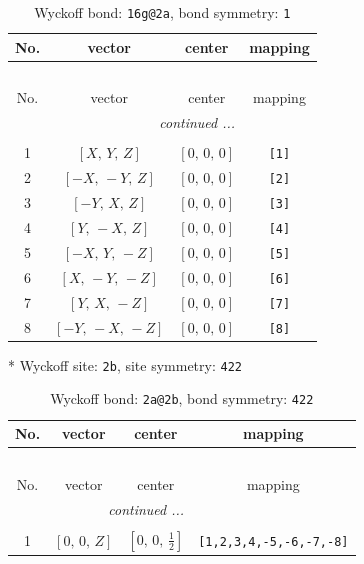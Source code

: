 \documentclass[fleqn,8pt]{jsarticle}
\begin{document}
\renewcommand{\arraystretch}{1.2}
\begin{longtable}{cccc}
\caption{Wyckoff bond: {\tt 16g@2a}, bond symmetry: {\tt 1}}
 \\
 \hline \hline
No. & vector & center & mapping \\ \hline \endfirsthead

\multicolumn{3}{l}{\tablename\ \thetable{}} \\
 \hline \hline
No. & vector & center & mapping \\ \hline \endhead

 \hline \hline
\multicolumn{3}{r}{\footnotesize\it continued ...} \\ \endfoot

 \hline \hline
\multicolumn{3}{r}{} \\ \endlastfoot

1 & $\left[ X,\, Y,\, Z \right]$ & $\left[ 0,\, 0,\, 0 \right]$ & {\tt [1]} \\ \hline
2 & $\left[ - X,\, - Y,\, Z \right]$ & $\left[ 0,\, 0,\, 0 \right]$ & {\tt [2]} \\ \hline
3 & $\left[ - Y,\, X,\, Z \right]$ & $\left[ 0,\, 0,\, 0 \right]$ & {\tt [3]} \\ \hline
4 & $\left[ Y,\, - X,\, Z \right]$ & $\left[ 0,\, 0,\, 0 \right]$ & {\tt [4]} \\ \hline
5 & $\left[ - X,\, Y,\, - Z \right]$ & $\left[ 0,\, 0,\, 0 \right]$ & {\tt [5]} \\ \hline
6 & $\left[ X,\, - Y,\, - Z \right]$ & $\left[ 0,\, 0,\, 0 \right]$ & {\tt [6]} \\ \hline
7 & $\left[ Y,\, X,\, - Z \right]$ & $\left[ 0,\, 0,\, 0 \right]$ & {\tt [7]} \\ \hline
8 & $\left[ - Y,\, - X,\, - Z \right]$ & $\left[ 0,\, 0,\, 0 \right]$ & {\tt [8]} \\
\end{longtable}
* Wyckoff site: {\tt 2b}, site symmetry: {\tt 422}
\renewcommand{\arraystretch}{1.2}
\begin{longtable}{cccc}
\caption{Wyckoff bond: {\tt 2a@2b}, bond symmetry: {\tt 422}}
 \\
 \hline \hline
No. & vector & center & mapping \\ \hline \endfirsthead

\multicolumn{3}{l}{\tablename\ \thetable{}} \\
 \hline \hline
No. & vector & center & mapping \\ \hline \endhead

 \hline \hline
\multicolumn{3}{r}{\footnotesize\it continued ...} \\ \endfoot

 \hline \hline
\multicolumn{3}{r}{} \\ \endlastfoot

1 & $\left[ 0,\, 0,\, Z \right]$ & $\left[ 0,\, 0,\, \frac{1}{2} \right]$ & {\tt [1,2,3,4,-5,-6,-7,-8]} \\
\end{longtable}
\end{document}
